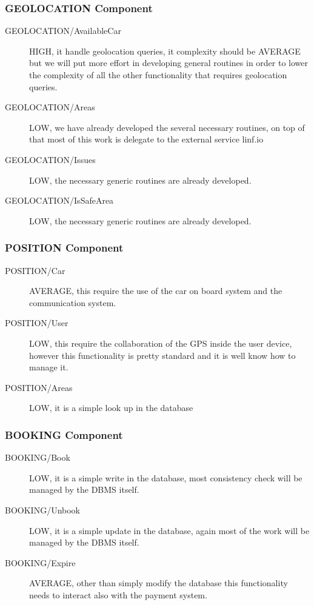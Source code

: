 \documentclass[11pt]{article} %
\begin{document}
\subsubsection{GEOLOCATION Component}

\begin{description}
	\item[GEOLOCATION/AvailableCar] HIGH, it handle geolocation queries, it complexity should be AVERAGE but we will put more effort in developing general routines in order to lower the complexity of all the other functionality that requires geolocation queries.
	\item[GEOLOCATION/Areas] LOW, we have already developed the several necessary routines, on top of that most of this work is delegate to the external service linf.io
	\item[GEOLOCATION/Issues] LOW, the necessary generic routines are already developed.
	\item[GEOLOCATION/IsSafeArea] LOW, the necessary generic routines are already developed.
\end{description}

\subsubsection{POSITION Component}

\begin{description}
	\item[POSITION/Car] AVERAGE, this require the use of the car on board system and the communication system.
	\item[POSITION/User] LOW, this require the collaboration of the GPS inside the user device, however this functionality is pretty standard and it is well know how to manage it.
	\item[POSITION/Areas] LOW, it is a simple look up in the database
\end{description}

\subsubsection{BOOKING Component}

\begin{description}
	\item[BOOKING/Book] LOW, it is a simple write in the database, most consistency check will be managed by the DBMS itself.
	\item[BOOKING/Unbook] LOW, it is a simple update in the database, again most of the work will be managed by the DBMS itself.
	\item[BOOKING/Expire] AVERAGE, other than simply modify the database this functionality needs to interact also with the payment system.
\end{description}
\end{document}
